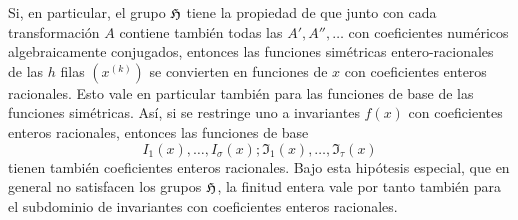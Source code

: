 \documentclass[11pt]{article}
\begin{document}
Si, en particular, el grupo \(\mathfrak H\) tiene la propiedad de que junto con cada transformación \(A\) contiene también todas las \(A',A'',\ldots\) con coeficientes numéricos algebraicamente conjugados, entonces las funciones simétricas entero-racionales de las \(h\) filas \((x^{(k)})\) se convierten en funciones de \(x\) con coeficientes enteros racionales. Esto vale en particular también para las funciones de base de las funciones simétricas. Así, si se restringe uno a invariantes \(f(x)\) con coeficientes enteros racionales, entonces las funciones de base
\[
        I_1(x),\ldots,I_\sigma(x);\mathfrak I_1(x),\ldots,\mathfrak I_\tau(x)
\]
tienen también coeficientes enteros racionales. Bajo esta hipótesis especial, que en general no satisfacen los grupos \(\mathfrak H\), la finitud entera vale por tanto también para el subdominio de invariantes con coeficientes enteros racionales.
\end{document}
